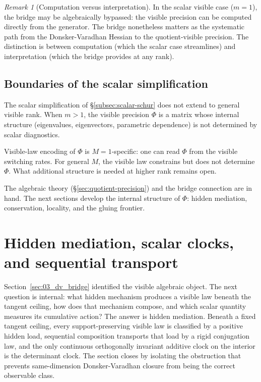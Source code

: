 \documentclass[11pt]{article}
\numberwithin{equation}{section}
\theoremstyle{thmcompact}
\theoremstyle{remark}
\newtheorem*{remarkplain}{Remark}
\newenvironment{remark}[1][]%
{\begin{remarkbox}\begin{remarkplain}[#1]\normalfont}
		{\end{remarkplain}\end{remarkbox}}
\begin{document}
\begin{remark}[Computation versus interpretation]
In the scalar visible case ($m = 1$), the bridge may be algebraically bypassed: the visible precision can be computed directly from the generator. The bridge nonetheless matters as the systematic path from the Donsker-Varadhan Hessian to the quotient-visible precision. The distinction is between computation (which the scalar case streamlines) and interpretation (which the bridge provides at any rank).
\end{remark}

\subsection{Boundaries of the scalar simplification}

The scalar simplification of \S\ref{subsec:scalar-schur} does not extend to general visible rank. When $m > 1$, the visible precision $\Phi$ is a matrix whose internal structure (eigenvalues, eigenvectors, parametric dependence) is not determined by scalar diagnostics.

Visible-law encoding of $\Phi$ is $M = 1$-specific: one can read $\Phi$ from the visible switching rates. For general $M$, the visible law constrains but does not determine $\Phi$. What additional structure is needed at higher rank remains open.

The algebraic theory (\S\ref{sec:quotient-precision}) and the bridge connection are in hand. The next sections develop the internal structure of $\Phi$: hidden mediation, conservation, locality, and the gluing frontier.



\section{Hidden mediation, scalar clocks, and sequential transport}
\label{sec:04_hidden_mediation}

Section~\ref{sec:03_dv_bridge} identified the visible algebraic object. The next question is internal: what hidden mechanism produces a visible law beneath the tangent ceiling, how does that mechanism compose, and which scalar quantity measures its cumulative action? The answer is hidden mediation. Beneath a fixed tangent ceiling, every support-preserving visible law is classified by a positive hidden load, sequential composition transports that load by a rigid conjugation law, and the only continuous orthogonally invariant additive clock on the interior is the determinant clock. The section closes by isolating the obstruction that prevents same-dimension Donsker-Varadhan closure from being the correct observable class.
\end{document}
